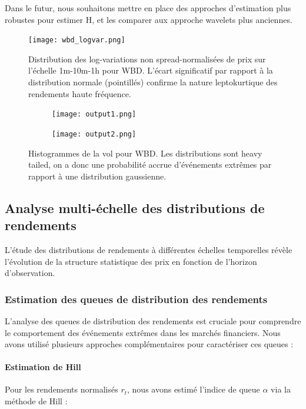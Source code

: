 \documentclass[10pt,a4paper]{article}
\theoremstyle{definition}
\theoremstyle{remark}
\begin{document}
\begin{itemize}
Dans le futur, nous souhaitons mettre en place des approches d'estimation plus robustes \cite{chong2024minimax, chong2024clt} pour estimer H, et les comparer aux approche wavelets plus anciennes. 



\begin{figure}[h!]
    \centering
        \texttt{[image: wbd\_logvar.png]}
    \caption{Distribution des log-variations non spread-normalisées de prix sur l'échelle 1m-10m-1h pour WBD. L'écart significatif par rapport à la distribution normale (pointillés) confirme la nature leptokurtique des rendements haute fréquence.}
    \label{fig:log_variations_wbd}
\end{figure}
\begin{figure}[h!]
    \centering
    \begin{subfigure}[b]{0.48\textwidth}
        \texttt{[image: output1.png]}
    \end{subfigure}
    \hfill
    \begin{subfigure}[b]{0.48\textwidth}
        \texttt{[image: output2.png]}
    \end{subfigure}
    \caption{Histogrammes de la vol pour WBD. Les distributions sont heavy tailed, on a donc une probabilité accrue d'événements extrêmes par rapport à une distribution gaussienne.}
    \label{fig:volatility_hist}
\end{figure}


\subsection{Analyse multi-échelle des distributions de rendements}

L'étude des distributions de rendements à différentes échelles temporelles révèle l'évolution de la structure statistique des prix en fonction de l'horizon d'observation.

\subsubsection{Estimation des queues de distribution des rendements}

L'analyse des queues de distribution des rendements est cruciale pour comprendre le comportement des événements extrêmes dans les marchés financiers. Nous avons utilisé plusieurs approches complémentaires pour caractériser ces queues :

\paragraph{Estimation de Hill}
Pour les rendements normalisés $r_t$, nous avons estimé l'indice de queue $\alpha$ via la méthode de Hill :


\end{itemize}
\end{document}
